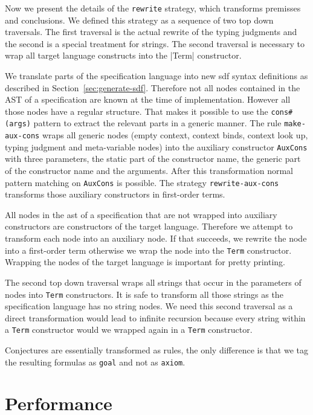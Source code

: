 Now we present the details of the \texttt{rewrite} strategy, which
transforms premisses and conclusions. We defined this strategy as a
sequence of two top down traversals. The first traversal is the actual
rewrite of the typing judgments and the second is a special treatment
for strings. The second traversal is necessary to wrap all target
language constructs into the \ver|Term| constructor.

We translate parts of the specification language into new \gls{sdf}
syntax definitions as described in
Section~\ref{sec:generate-sdf}. Therefore not all nodes contained in
the \gls{AST} of a specification are known at the time of
implementation. However all those nodes have a regular structure. That
makes it possible to use the \verb|cons#(args)| pattern to extract the
relevant parts in a generic manner. The rule \verb|make-aux-cons|
wraps all generic nodes (empty context, context binds, context look
up, typing judgment and meta-variable nodes) into the auxiliary
constructor \verb|AuxCons| with three parameters, the static part of
the constructor name, the generic part of the constructor name and the
arguments. After this transformation normal pattern matching on
\verb|AuxCons| is possible. The strategy \verb|rewrite-aux-cons|
transforms those auxiliary constructors in first-order terms.

All nodes in the \gls{ast} of a specification that are not wrapped
into auxiliary constructors are constructors of the target
language. Therefore we attempt to transform each node into an
auxiliary node. If that succeeds, we rewrite the node into a
first-order term otherwise we wrap the node into the \verb|Term|
constructor. Wrapping the nodes of the target language is important
for pretty printing.

The second top down traversal wraps all strings that occur in the
parameters of nodes into \verb|Term| constructors. It is safe to
transform all those strings as the specification language has no
string nodes. We need this second traversal as a direct transformation
would lead to infinite recursion because every string within a
\verb|Term| constructor would we wrapped again in a \verb|Term|
constructor.

Conjectures are essentially transformed as rules, the only difference
is that we tag the resulting formulas as \verb|goal| and not as
\verb|axiom|.
\section{Performance}




